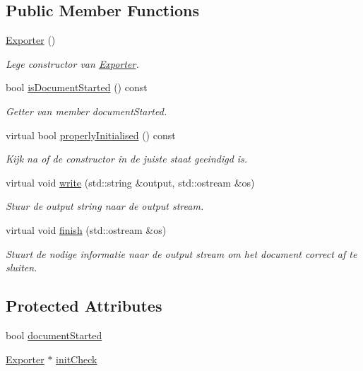 \subsection*{Public Member Functions}
\begin{DoxyCompactItemize}
\item 
\hyperlink{class_exporter_a2a977cb5ac8f637fcb570e73f650eca0}{Exporter} ()
\begin{DoxyCompactList}\small\item\em Lege constructor van \hyperlink{class_exporter}{Exporter}. \end{DoxyCompactList}\item 
bool \hyperlink{class_exporter_a3ef5b88b982577090f4960fabae518c1}{is\+Document\+Started} () const
\begin{DoxyCompactList}\small\item\em Getter van member document\+Started. \end{DoxyCompactList}\item 
virtual bool \hyperlink{class_exporter_aafd9df9210aeefd7bb7fd434fc317cf0}{properly\+Initialised} () const
\begin{DoxyCompactList}\small\item\em Kijk na of de constructor in de juiste staat geeindigd is. \end{DoxyCompactList}\item 
virtual void \hyperlink{class_exporter_ab3736803133eb727cf87a7306f91eb11}{write} (std\+::string \&output, std\+::ostream \&os)
\begin{DoxyCompactList}\small\item\em Stuur de output string naar de output stream. \end{DoxyCompactList}\item 
virtual void \hyperlink{class_exporter_ae477714f462d70cfc5b3970f91fcc4ed}{finish} (std\+::ostream \&os)
\begin{DoxyCompactList}\small\item\em Stuurt de nodige informatie naar de output stream om het document correct af te sluiten. \end{DoxyCompactList}\end{DoxyCompactItemize}
\subsection*{Protected Attributes}
\begin{DoxyCompactItemize}
\item 
bool \hyperlink{class_exporter_a7d55f6023d5fe983512f6b02fb60733b}{document\+Started}
\item 
\hyperlink{class_exporter}{Exporter} $\ast$ \hyperlink{class_exporter_a74245e988d8e72a43704dda927acff05}{init\+Check}
\end{DoxyCompactItemize}


